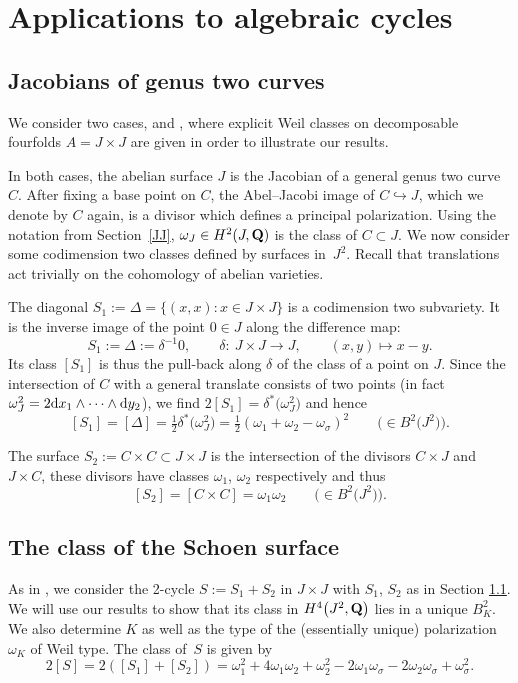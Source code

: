 \documentclass[pdftex]{sigma}
\numberwithin{equation}{section}
\begin{document}
\section{Applications to algebraic cycles}\label{cycles}

\subsection{Jacobians of genus two curves}\label{jacs}
We consider two cases, \cite{schoen} and \cite{vG}, where explicit Weil classes
on decomposable fourfolds $A=J\times J$ are given in order to illustrate
our results.

In both cases, the abelian surface $J$ is the Jacobian of a general genus two curve $C$.
After fixing a base point on $C$,
the Abel--Jacobi image of $C\hookrightarrow J$,
which we denote by $C$ again,
is a divisor which defines a principal polarization.
Using the notation from Section~\ref{JJ},
$\omega_J\in H^2(J,{\bf Q})$ is the class of $C\subset J$.
We now consider some codimension two classes defined by surfaces in~$J^2$.
Recall that translations act trivially on the cohomology of abelian varieties.

The diagonal $S_1:=\Delta=\{(x,x)\colon x\in J\times J\}$ is a codimension two subvariety.
It is the inverse image of the point $0\in J$ along the difference map:
\[
S_1 := \Delta := \delta^{-1}0,\qquad
\delta\colon \ J\times J \longrightarrow J,\qquad(x,y)\longmapsto x-y.
\]
Its class $[S_1]$ is thus the pull-back along $\delta$ of the class of a point on $J$.
Since the intersection of $C$ with a general translate consists
of two points (in fact $\omega_J^2=2{\rm d} x_1\wedge\dots \wedge{\rm d} y_2$),
we find $2[S_1]=\delta^*\big(\omega_J^2\big)$ and hence
\[
[S_1] = [\Delta] = \tfrac{1}{2} \delta^*\big(\omega_J^2\big) =
\tfrac{1}{2} (\omega_1+\omega_2-\omega_\sigma)^2\qquad\big(\!\!\in B^2\big(J^2\big)\big).
\]

The surface $S_2:=C\times C\subset J\times J$ is the intersection of the divisors
$C\times J$ and $J\times C$, these divisors have classes $\omega_1$, $\omega_2$ respectively and thus
\[
[S_2] = [C\times C] = \omega_1\omega_2\qquad\big(\!\!\in B^2\big(J^2\big)\big).
\]

\subsection{The class of the Schoen surface}\label{cc}
As in \cite{schoen}, we consider the 2-cycle $S:=S_1+S_2$ in $J\times J$
with $S_1$, $S_2$ as in Section \ref{jacs}. We will use our results to show that its
class in $H^4\big(J^2,{\bf Q}\big)$ lies in a unique $B^2_K$.
We also determine $K$ as well as the type of the (essentially
unique) polarization $\omega_K$ of Weil type. The class of~$S$ is given by
\[
2[S] = 2([S_1]+[S_2]) = \omega_1^2 + 4\omega_1\omega_2 + \omega_2^2
 - 2\omega_1\omega_\sigma - 2\omega_2\omega_\sigma + \omega_\sigma^2.
\]
\end{document}
